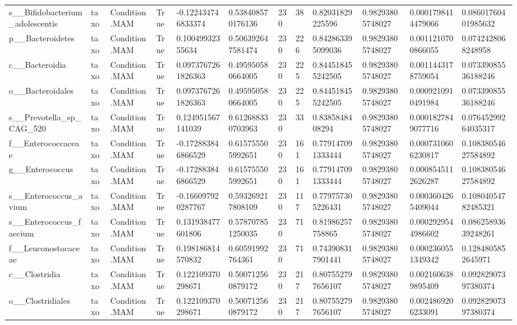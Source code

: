 \begin{longtable}{llllllllllll}
s\_\_Bifidobacterium\_adolescentis & taxo & Condition.MAM & True & -0.122434746833374 & 0.538408570176136 & 230 & 38 & 0.82031829225596 & 0.98293805748027 & 0.0001798414479066 & 0.08601760401985632 \\
p\_\_Bacteroidetes & taxo & Condition.MAM & True & 0.10049932355634 & 0.506392647581474 & 230 & 226 & 0.842863395099036 & 0.98293805748027 & 0.0011210700866055 & 0.0742428068248958 \\
c\_\_Bacteroidia & taxo & Condition.MAM & True & 0.0973767261826363 & 0.495950580664005 & 230 & 225 & 0.844518455242505 & 0.98293805748027 & 0.0011443178759054 & 0.07339085536188246 \\
o\_\_Bacteroidales & taxo & Condition.MAM & True & 0.0973767261826363 & 0.495950580664005 & 230 & 225 & 0.844518455242505 & 0.98293805748027 & 0.0009210910491984 & 0.07339085536188246 \\
s\_\_Prevotella\_sp\_CAG\_520 & taxo & Condition.MAM & True & 0.124951567141039 & 0.612688330703963 & 230 & 33 & 0.8385848408294 & 0.98293805748027 & 0.0001827849077716 & 0.07645299264035317 \\
f\_\_Enterococcaceae & taxo & Condition.MAM & True & -0.172883846866529 & 0.615755505992651 & 230 & 161 & 0.779147091333444 & 0.98293805748027 & 0.0007310606230817 & 0.10838054627584892 \\
g\_\_Enterococcus & taxo & Condition.MAM & True & -0.172883846866529 & 0.615755505992651 & 230 & 161 & 0.779147091333444 & 0.98293805748027 & 0.0008545112626287 & 0.10838054627584892 \\
s\_\_Enterococcus\_avium & taxo & Condition.MAM & True & -0.166097920287767 & 0.593269217808109 & 230 & 117 & 0.779757305226431 & 0.98293805748027 & 0.0003604265409044 & 0.10804054782485321 \\
s\_\_Enterococcus\_faecium & taxo & Condition.MAM & True & 0.131938477601806 & 0.578707851250035 & 230 & 71 & 0.81986257758865 & 0.98293805748027 & 0.0002929544986602 & 0.08625893639248261 \\
f\_\_Leuconostocaceae & taxo & Condition.MAM & True & 0.198186814570832 & 0.60591992764361 & 230 & 71 & 0.743908317901441 & 0.98293805748027 & 0.0002360551349342 & 0.1284805852645971 \\
c\_\_Clostridia & taxo & Condition.MAM & True & 0.122109370298671 & 0.500712560879172 & 230 & 217 & 0.807552797656107 & 0.98293805748027 & 0.0021606389895409 & 0.09282907397380374 \\
o\_\_Clostridiales & taxo & Condition.MAM & True & 0.122109370298671 & 0.500712560879172 & 230 & 217 & 0.807552797656107 & 0.98293805748027 & 0.0024869206233091 & 0.09282907397380374 \\

\end{longtable}
